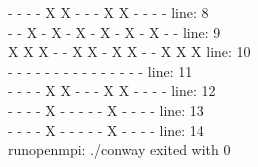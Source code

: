 \documentclass[a4paper, 14pt]{article}
\begin{document}
\begin{enumerate}
{ -  -  -  -  X  X  -  -  -  X  X  -  -  -  - 	line: 8\\
 -  -  X  -  X  -  X  -  X  -  X  -  X  -  - 	line: 9\\
 X  X  X  -  -  X  X  -  X  X  -  -  X  X  X 	line: 10\\
 -  -  -  -  -  -  -  -  -  -  -  -  -  -  - 	line: 11\\
 -  -  -  -  X  X  -  -  -  X  X  -  -  -  - 	line: 12\\
 -  -  -  -  X  -  -  -  -  -  X  -  -  -  - 	line: 13\\
 -  -  -  -  X  -  -  -  -  -  X  -  -  -  - 	line: 14\\
runopenmpi: ./conway exited with 0\\
}
\end{enumerate}
\end{document}
